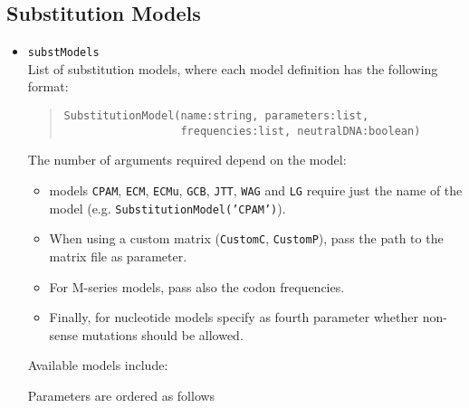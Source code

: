\documentclass[11pt]{article}
\begin{document}
\subsection{Substitution Models}
\begin{itemize}
\item{\texttt{substModels}} \hfill \\
List of substitution models, where each model definition has the following format:
\begin{quote}
\begin{verbatim}
SubstitutionModel(name:string, parameters:list, 
                  frequencies:list, neutralDNA:boolean)
\end{verbatim}
\end{quote}
The number of arguments required depend on the model:
\begin{itemize}
\item models \texttt{CPAM}, \texttt{ECM}, \texttt{ECMu}, \texttt{GCB}, \texttt{JTT}, \texttt{WAG} and \texttt{LG} require just the name of the model (e.g. \texttt{SubstitutionModel('CPAM')}).
\item When using a custom matrix (\texttt{CustomC}, \texttt{CustomP}), pass the path to the matrix file as parameter.
\item For M-series models, pass also the codon frequencies.
\item Finally, for nucleotide models specify as fourth parameter whether non-sense mutations should be allowed.
\end{itemize}
Available models include:
Parameters are ordered as follows
\end{itemize}
\end{document}
